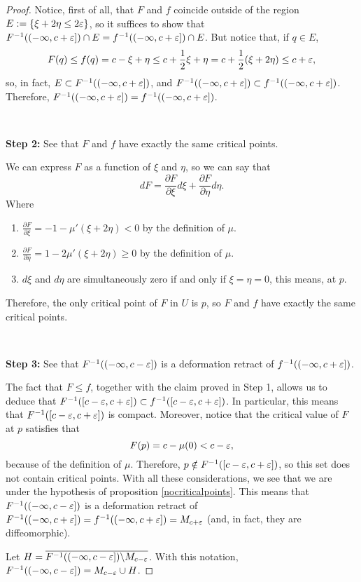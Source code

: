 \begin{proof}
Notice, first of all, that $F$ and $f$ coincide outside of the region $E:=\{ \xi + 2\eta \leq 2\varepsilon\}$, so it suffices to show that $F^{-1}((-\infty,c+\varepsilon]) \cap E = f^{-1}((-\infty,c+\varepsilon]) \cap E$. But notice that, if $q \in E$,
\[F(q) \leq f(q) = c - \xi + \eta \leq c + \frac12 \xi + \eta = c + \frac12 (\xi + 2\eta) \leq c + \varepsilon ,\]
so, in fact, $E \subset F^{-1}((-\infty,c+\varepsilon])$, and $F^{-1}((-\infty,c+\varepsilon]) \subset f^{-1}((-\infty,c+\varepsilon])$. Therefore, $F^{-1}((-\infty,c+\varepsilon]) = f^{-1}((-\infty,c+\varepsilon])$.

\

{\bf Step 2:} See that $F$ and $f$ have exactly the same critical points.

We can express $F$ as a function of $\xi$ and $\eta$, so we can say that
\[d F = \frac{\partial F}{\partial \xi} d \xi + \frac{\partial F}{\partial \eta} d \eta .\]
Where

\begin{enumerate}
	\item $\frac{\partial F}{\partial \xi} = -1 - \mu'(\xi+2\eta) < 0$ by the definition of $\mu$.
	\item $\frac{\partial F}{\partial \eta} = 1 - 2 \mu'(\xi+2\eta) \geq 0$ by the definition of $\mu$.
	\item $d \xi$ and $d \eta$ are simultaneously zero if and only if $\xi = \eta = 0$, this means, at $p$.
\end{enumerate}

Therefore, the only critical point of $F$ in $U$ is $p$, so $F$ and $f$ have exactly the same critical points.

\

{\bf Step 3:} See that $F^{-1}((-\infty,c-\varepsilon])$ is a deformation retract of $f^{-1}((-\infty,c+\varepsilon])$.

The fact that $F \leq f$, together with the claim proved in Step 1, allows us to deduce that $F^{-1}([c-\varepsilon,c+\varepsilon]) \subset f^{-1}([c-\varepsilon,c+\varepsilon])$. In particular, this means that $F^{-1}([c-\varepsilon,c+\varepsilon])$ is compact. Moreover, notice that the critical value of $F$ at $p$ satisfies that
\[F(p) = c - \mu(0) < c - \varepsilon ,\]
because of the definition of $\mu$. Therefore, $p \notin F^{-1}([c-\varepsilon,c+\varepsilon])$, so this set does not contain critical points. With all these considerations, we see that we are under the hypothesis of proposition \ref{nocriticalpoints}. This means that $F^{-1}((-\infty,c-\varepsilon])$ is a deformation retract of $F^{-1}((-\infty,c+\varepsilon]) = f^{-1}((-\infty,c+\varepsilon]) = M_{c+\varepsilon}$ (and, in fact, they are diffeomorphic).

Let $H = \overline{F^{-1}((-\infty,c-\varepsilon]) \backslash M_{c-\varepsilon}}$. With this notation, $F^{-1}((-\infty,c-\varepsilon]) = M_{c-\varepsilon} \cup H$.


\end{proof}
